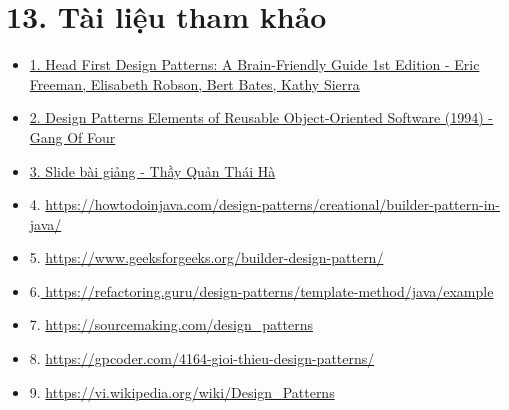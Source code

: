 \chapter{13. Tài liệu tham khảo}
\begin{itemize}
    \item \href{https://longbiao.spatial-crowdsensing.com/courses/scad/files/head-first-design-patterns-compressed.pdf?fbclid=IwAR08wFBdT3wd6eEFGb6vY8Ly3RGo2-mei7ZKaavInDRo9BfUH67-msnrN9E}{1. Head First Design Patterns: A Brain-Friendly Guide 1st Edition -   Eric Freeman, Elisabeth Robson, Bert Bates, Kathy Sierra}
    \item \href{https://github.com/nanhus/OOP-DesginPatten/blob/master/reference/Head\%20First\%20Design\%20Patterns.pdf}{2. Design Patterns Elements of Reusable Object-Oriented Software (1994) - Gang
    Of Four}
    \item \href{https://github.com/nanhus/OOP-DesginPatten/blob/master/reference/WJ2021_OOP11_DesignPatterns.pdf}{3. Slide bài giảng - Thầy Quản Thái Hà}
    \item 4. \url{https://howtodoinjava.com/design-patterns/creational/builder-pattern-in-java/}
    \item 5. \url{https://www.geeksforgeeks.org/builder-design-pattern/}
    \item 6.\url{ https://refactoring.guru/design-patterns/template-method/java/example}
    \item 7. \url{https://sourcemaking.com/design_patterns}
    \item 8. \url{https://gpcoder.com/4164-gioi-thieu-design-patterns/}
    \item 9. \url{https://vi.wikipedia.org/wiki/Design_Patterns}
\end{itemize}